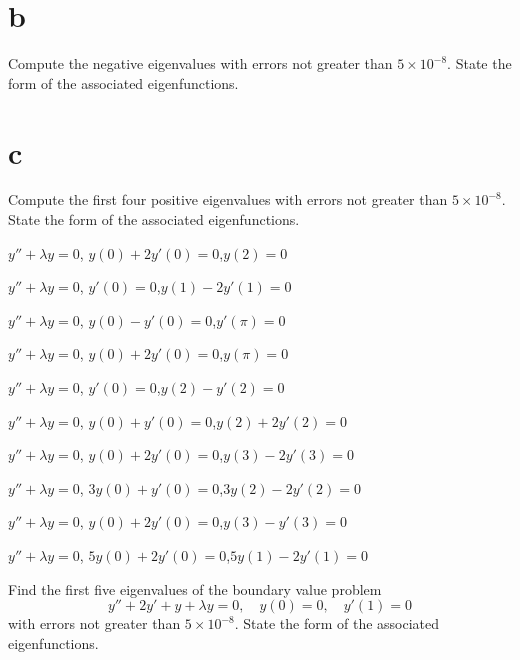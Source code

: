 \begin{exerciselist}
{  \part{b} Compute the negative eigenvalues with errors not greater than $5\times10^{-8}$. State the
  form of the associated eigenfunctions.

  \part{c} Compute the first four positive eigenvalues with errors not greater than
  $5\times10^{-8}$. State the form of the associated eigenfunctions.}

  \item\label{exer:13.2.11} \Cex $y''+\lambda y=0$, \quad $y(0)+2y'(0)=0$,\quad $y(2)=0$

  \item\label{exer:13.2.12} \Cex $y''+\lambda y=0$, \quad $y'(0)=0$,\quad $y(1)-2y'(1)=0$

  \item\label{exer:13.2.13}\Cex $y''+\lambda y=0$, \quad $y(0)-y'(0)=0$,\quad $y'(\pi)=0$

  \item\label{exer:13.2.14}\Cex $y''+\lambda y=0$, \quad $y(0)+2y'(0)=0$,\quad $y(\pi)=0$

  \item\label{exer:13.2.15} \Cex $y''+\lambda y=0$, \quad $y'(0)=0$,\quad $y(2)-y'(2)=0$

  \item\label{exer:13.2.16} \Cex $y''+\lambda y=0$, \quad $y(0)+y'(0)=0$,\quad $y(2)+2y'(2)=0$

  \item\label{exer:13.2.17} \Cex $y''+\lambda y=0$, \quad $y(0)+2y'(0)=0$,\quad $y(3)-2y'(3)=0$

  \item\label{exer:13.2.18} \Cex $y''+\lambda y=0$, \quad $3y(0)+y'(0)=0$,\quad $3y(2)-2y'(2)=0$

  \item\label{exer:13.2.19} \Cex $y''+\lambda y=0$, \quad $y(0)+2y'(0)=0$,\quad $y(3)-y'(3)=0$

  \item\label{exer:13.2.20} \Cex $y''+\lambda y=0$, \quad $5y(0)+2y'(0)=0$,\quad $5y(1)-2y'(1)=0$

  \item\label{exer:13.2.21} Find the first five eigenvalues of the boundary value problem
  \[
    y''+2y'+y+\lambda y=0,\quad y(0)=0,\quad y'(1)=0
  \]
  with errors not greater than $5\times10^{-8}$. State the form of the associated eigenfunctions.


\end{exerciselist}
